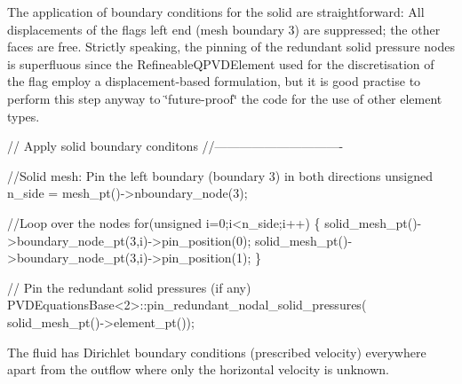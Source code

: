 The application of boundary conditions for the solid are straightforward\+: All displacements of the flag\textquotesingle{}s left end (mesh boundary 3) are suppressed; the other faces are free. Strictly speaking, the pinning of the redundant solid pressure nodes is superfluous since the {\ttfamily Refineable\+Q\+P\+V\+D\+Element} used for the discretisation of the flag employ a displacement-\/based formulation, but it is good practise to perform this step anyway to \char`\"{}future-\/proof\char`\"{} the code for the use of other element types.


\begin{DoxyCodeInclude}
 


 \textcolor{comment}{// Apply solid boundary conditons}
 \textcolor{comment}{//-------------------------------}
 
 \textcolor{comment}{//Solid mesh: Pin the left boundary (boundary 3) in both directions}
 \textcolor{keywordtype}{unsigned} n\_side = mesh\_pt()->nboundary\_node(3);
 
 \textcolor{comment}{//Loop over the nodes}
 \textcolor{keywordflow}{for}(\textcolor{keywordtype}{unsigned} i=0;i<n\_side;i++)
  \{
   solid\_mesh\_pt()->boundary\_node\_pt(3,i)->pin\_position(0);
   solid\_mesh\_pt()->boundary\_node\_pt(3,i)->pin\_position(1);
  \}
 
 \textcolor{comment}{// Pin the redundant solid pressures (if any)}
 PVDEquationsBase<2>::pin\_redundant\_nodal\_solid\_pressures(
  solid\_mesh\_pt()->element\_pt());

\end{DoxyCodeInclude}


The fluid has Dirichlet boundary conditions (prescribed velocity) everywhere apart from the outflow where only the horizontal velocity is unknown.


